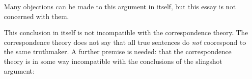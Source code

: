 Many objections can be made to this argument in itself, but this essay is not concerned with them.

This conclusion in itself is not incompatible with the correspondence theory.
The correspondence theory does not say that all true sentences do \emph{not} coorespond to the same truthmaker.
A further premise is needed: that the correspondence theory is in some way incompatible with the conclusions of the slingshot argument:





